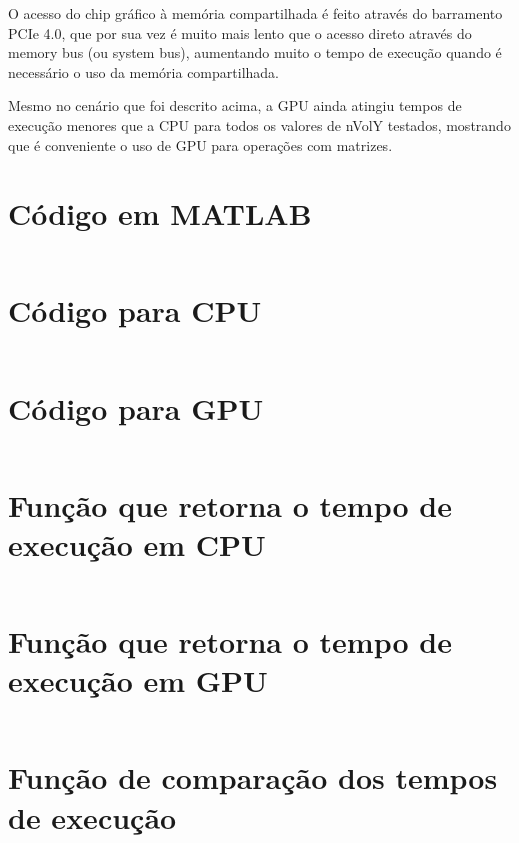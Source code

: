 \documentclass[
    12pt,
    openright,
    oneside,
    a4paper,
    english,
    brazil,
]{abntex2}
\begin{document}
O acesso do chip gráfico à memória compartilhada é feito através do barramento PCIe 4.0, que por sua vez é muito mais lento que o acesso direto através do memory bus (ou system bus), aumentando muito o tempo de execução quando é necessário o uso da memória compartilhada.

Mesmo no cenário que foi descrito acima, a GPU ainda atingiu tempos de execução menores que a CPU para todos os valores de nVolY testados, mostrando que é conveniente o uso de GPU para operações com matrizes.

\postextual



\begin{apendicesenv}

\partapendices
{}

\chapter{Código em MATLAB}

\inputminted{octave}{cfd_on_gpu/reference/matlab_version.m}

\chapter{Código para CPU}

\inputminted{python}{cfd_on_gpu/jacobi/jacobi_CPU_numpy.py}

\chapter{Código para GPU}

\inputminted{python}{cfd_on_gpu/jacobi/jacobi_GPU_cupy.py}

\chapter{Função que retorna o tempo de execução em CPU}

\inputminted{python}{cfd_on_gpu/compare/cpu.py}

\chapter{Função que retorna o tempo de execução em GPU}

\inputminted{python}{cfd_on_gpu/compare/gpu.py}

\chapter{Função de comparação dos tempos de execução}

\inputminted{python}{cfd_on_gpu/compare/app.py}

\end{apendicesenv}
\end{document}
